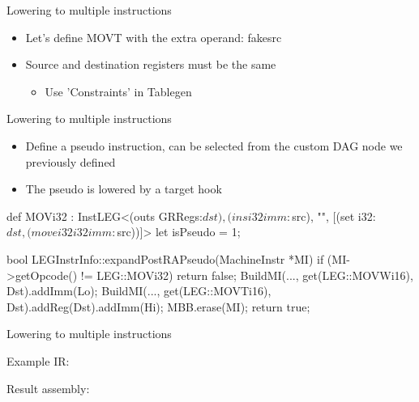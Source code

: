 
\begin{frame}[fragile]{Lowering to multiple instructions}

\begin{itemize}
    \item Let's define MOVT with the extra operand: fakesrc
    \item Source and destination registers must be the same
    \begin{itemize}
        \item Use 'Constraints' in Tablegen
    \end{itemize}
\end{itemize}


\end{frame}


\begin{frame}[fragile]{Lowering to multiple instructions}

\begin{itemize}
    \item Define a pseudo instruction, can be selected from the custom DAG node we previously defined
    \item The pseudo is lowered by a target hook
\end{itemize}

\begin{codebox}
def MOVi32 : InstLEG<(outs GRRegs:$dst), (ins i32imm:$src), "",
                     [(set i32:$dst, (movei32 i32imm:$src))]> {
  let isPseudo = 1;
}
\end{codebox}

\begin{codebox}
bool LEGInstrInfo::expandPostRAPseudo(MachineInstr *MI) {
   if (MI->getOpcode() != LEG::MOVi32) return false;
   BuildMI(..., get(LEG::MOVWi16), Dst).addImm(Lo);
   BuildMI(..., get(LEG::MOVTi16), Dst).addReg(Dst).addImm(Hi);
   MBB.erase(MI);
   return true;
}
\end{codebox}

\end{frame}


\begin{frame}{Lowering to multiple instructions}

Example IR:

Result assembly:

\end{frame}
